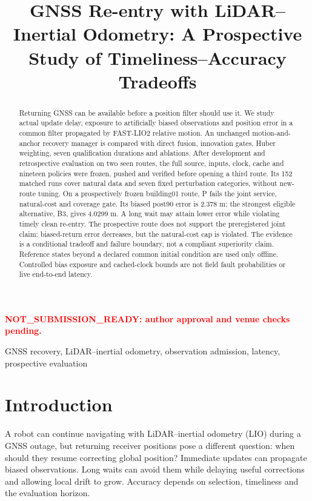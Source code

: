 \documentclass[conference]{IEEEtran}
\title{GNSS Re-entry with LiDAR--Inertial Odometry: A Prospective Study of Timeliness--Accuracy Tradeoffs}
\author{\IEEEauthorblockN{Internal author-review draft: authors and affiliations unassigned}}
\newcommand{\reviewmark}{\textcolor{red}{\textbf{NOT\_SUBMISSION\_READY: author approval and venue checks pending.}}}
\begin{document}
\maketitle
\begin{center}\small\reviewmark\end{center}
\begin{abstract}
Returning GNSS can be available before a position filter should use it. We study actual update delay, exposure to artificially biased observations and position error in a common filter propagated by FAST-LIO2 relative motion. An unchanged motion-and-anchor recovery manager is compared with direct fusion, innovation gates, Huber weighting, seven qualification durations and ablations. After development and retrospective evaluation on two seen routes, the full source, inputs, clock, cache and nineteen policies were frozen, pushed and verified before opening a third route. Its 152 matched runs cover natural data and seven fixed perturbation categories, without new-route tuning. On a prospectively frozen building01 route, P fails the joint service, natural-cost and coverage gate. Its biased post90 error is 2.378 m; the strongest eligible alternative, B3, gives 4.0299 m. A long wait may attain lower error while violating timely clean re-entry. The prospective route does not support the preregistered joint claim: biased-return error decreases, but the natural-cost cap is violated. The evidence is a conditional tradeoff and failure boundary, not a compliant superiority claim. Reference states beyond a declared common initial condition are used only offline. Controlled bias exposure and cached-clock bounds are not field fault probabilities or live end-to-end latency.
\end{abstract}
\begin{IEEEkeywords}GNSS recovery, LiDAR--inertial odometry, observation admission, latency, prospective evaluation\end{IEEEkeywords}

\section{Introduction}
A robot can continue navigating with LiDAR--inertial odometry (LIO) during a GNSS outage, but returning receiver positions pose a different question: when should they resume correcting global position? Immediate updates can propagate biased observations. Long waits can avoid them while delaying useful corrections and allowing local drift to grow. Accuracy depends on selection, timeliness and the evaluation horizon.
\end{document}
